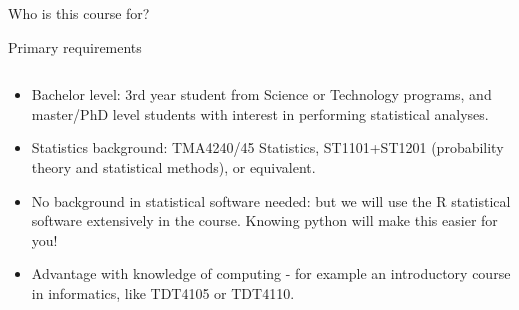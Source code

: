 \documentclass[10pt,ignorenonframetext,]{beamer}
\providecommand{\tightlist}{%
  \setlength{\itemsep}{0pt}\setlength{\parskip}{0pt}}
\begin{document}
\begin{frame}{Who is this course for?}
\protect\hypertarget{who-is-this-course-for}{}

\begin{block}{Primary requirements}

\(~\)

\begin{itemize}
\tightlist
\item
  Bachelor level: 3rd year student from Science or Technology programs,
  and master/PhD level students with interest in performing statistical
  analyses.
\end{itemize}

\vspace{2mm}

\begin{itemize}
\tightlist
\item
  Statistics background: TMA4240/45 Statistics, ST1101+ST1201
  (probability theory and statistical methods), or equivalent.
\end{itemize}

\vspace{2mm}

\begin{itemize}
\tightlist
\item
  No background in statistical software needed: but we will use the R
  statistical software extensively in the course. Knowing python will
  make this easier for you!
\end{itemize}

\vspace{2mm}

\begin{itemize}
\tightlist
\item
  Advantage with knowledge of computing - for example an introductory
  course in informatics, like TDT4105 or TDT4110.
\end{itemize}

\end{block}

\end{frame}
\end{document}
